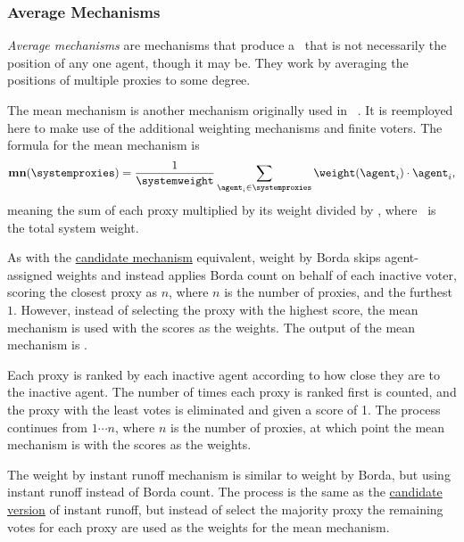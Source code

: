 \subsubsection{Average Mechanisms}\label{subsubsec:average-mechanisms}
\textit{Average mechanisms} are mechanisms that produce a \systemtruth\ that
is not necessarily the position of any one agent, though it may be.
They work by averaging the positions of multiple proxies to some degree.

The mean mechanism is another mechanism originally used in
~\cite{Cohensius2017}.
It is reemployed here to make use of the additional weighting mechanisms and
finite voters.
The formula for the mean mechanism is
\begin{equation*}
    \mathbf{mn}(\systemproxies) =
    \frac{1}{\systemweight}
    \sum_{\agent_i \in \systemproxies} {\weightof{\agent_i} \cdot \agent_i}
    \text{,}\label{eq:mean-mechanism}
\end{equation*}
meaning the sum of each proxy multiplied by its weight divided by
\systemweight, where \systemweight\ is the total system weight.

As with the \hyperref[para:candidate-borda]{candidate mechanism} equivalent,
weight by Borda skips agent-assigned weights and instead applies Borda count
on behalf of each inactive voter, scoring the closest proxy as $n$, where $n$
is the number of proxies, and the furthest $1$.
However, instead of selecting the proxy with the highest score, the mean
mechanism is used with the scores as the weights.
The output of the mean mechanism is \systemtruth.

Each proxy is ranked by each inactive agent according to how close they are
to the inactive agent.
The number of times each proxy is ranked first is counted, and the proxy with
the least votes is eliminated and given a score of 1.
The process continues from $1 \cdots n$, where $n$ is the number of proxies,
at which point the mean mechanism is with the scores as the weights.

\label{para:avg-instant-runoff}
The weight by instant runoff mechanism is similar to weight by Borda, but
using instant runoff instead of Borda count.
The process is the same as the
\hyperref[para:candidate-instant-runoff]{candidate version} of instant
runoff, but instead of select the majority proxy the remaining votes for
each proxy are used as the weights for the mean mechanism.

